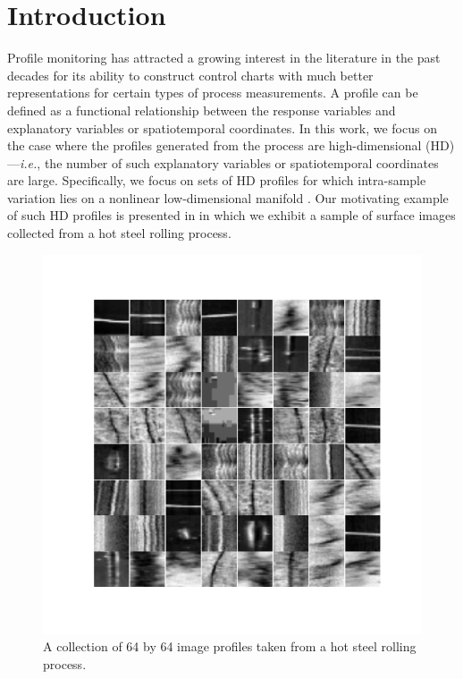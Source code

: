 \documentclass{scrartcl}
\theoremstyle{definition}
\let\ref\Cref
\begin{document}


\section{Introduction}\label{sec:introduction}
Profile monitoring has attracted a growing interest in the literature in the past decades \parencite{Woodall2004-bp,Woodall2007-xs,Maleki2018-uo} for its ability to construct control charts with much better representations for certain types of process measurements.
A profile can be defined as a functional relationship between the  response variables and explanatory variables or spatiotemporal coordinates.
In this work, we focus on the case where the profiles generated from the process are high-dimensional (HD)---\textit{i.e.}, the number of such explanatory variables or spatiotemporal coordinates are large.
Specifically, we focus on sets of HD profiles for which intra-sample variation lies on a nonlinear low-dimensional manifold \parencite{Shi2016-tg}.
Our motivating example of such HD profiles is presented in \ref{fig:Rolling} in which we exhibit a sample of surface images collected from a hot steel rolling process.

\begin{figure}[t]
	
	\includegraphics[width=0.9\linewidth]{figs/profile_examples.pdf}
	\caption{A collection of 64 by 64 image profiles taken from a hot steel rolling process.}
	\label{fig:Rolling}
\end{figure}
\end{document}
